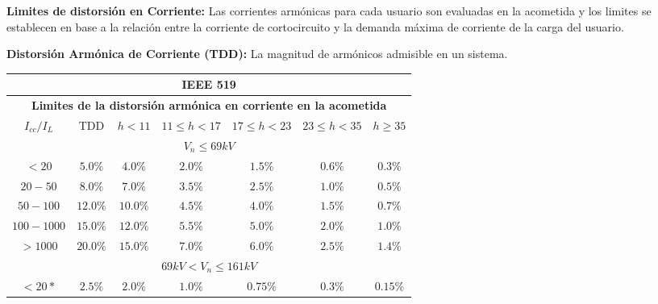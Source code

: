 \textbf{Limites de distorsión en Corriente:} Las corrientes armónicas para cada usuario son evaluadas en la acometida y los limites se establecen en base a la relación entre la corriente de cortocircuito y la demanda máxima de corriente de la carga del usuario.

\textbf{Distorsión Armónica de Corriente (TDD):} La magnitud de armónicos admisible en un sistema.

\begin{table}[H]
\small
\begin{center}
\begin{tabular}{| c | c | c | c | c | c | c |}
 \hline
                                            \multicolumn{7}{|c|}{\textbf{IEEE 519}}                                                \\
 \hline
                  \multicolumn{7}{|c|}{\textbf{Limites de la distorsión armónica en corriente en la acometida}}                  \\
 \hline
    $I_{cc}/I_L$ &    TDD    &  $h < 11$   &   $11 \leq h < 17$   &   $17 \leq h < 23$   &   $23 \leq h < 35$   &   $h \geq 35$  \\ 
 \hline
                                           \multicolumn{7}{|c|}{\textbf{$V_n \leq 69 kV$}}                                       \\
 \hline
    $< 20$       &  $5.0\%$  &    $4.0\%$  &         $2.0\%$      &        $1.5\%$       &         $0.6\%$      &     $0.3\%$    \\
 \hline
	$20-50$      &  $8.0\%$  &    $7.0\%$  &         $3.5\%$      &        $2.5\%$       &         $1.0\%$      &     $0.5\%$    \\
 \hline
	$50-100$     & $12.0\%$  &   $10.0\%$  &         $4.5\%$      &        $4.0\%$       &         $1.5\%$      &     $0.7\%$    \\
 \hline
    $100-1000$   & $15.0\%$  &   $12.0\%$  &         $5.5\%$      &        $5.0\%$       &         $2.0\%$      &     $1.0\%$    \\
 \hline
    $>1000$      & $20.0\%$  &   $15.0\%$  &         $7.0\%$      &        $6.0\%$       &         $2.5\%$      &     $1.4\%$    \\
 \hline
                                       \multicolumn{7}{|c|}{\textbf{$69 kV < V_n \leq 161 kV$}}                                  \\
 \hline
    $< 20*$      &  $2.5\%$  &    $2.0\%$  &         $1.0\%$      &       $0.75\%$       &         $0.3\%$      &     $0.15\%$   \\

\end{tabular}
\end{center}
\end{table}
